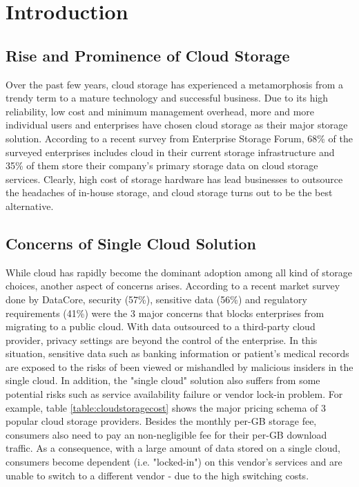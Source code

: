\chapter{Introduction}
\label{c:intro}

\section{Rise and Prominence of Cloud Storage}
\label{s:riseandprominenceofcloudstorage}
Over the past few years, cloud storage has experienced a metamorphosis from a trendy term to a mature technology and successful business. Due to its high reliability, low cost and minimum management overhead, more and more individual users and enterprises have chosen cloud storage as their major storage solution. According to a recent survey from Enterprise Storage Forum\cite{storagetrends2018}, 68\% of the surveyed enterprises includes cloud in their current storage infrastructure and 35\% of them store their company's primary storage data on cloud storage services. Clearly, high cost of storage hardware has lead businesses to outsource the headaches of in-house storage, and cloud storage turns out to be the best alternative.

\section{Concerns of Single Cloud Solution}
\label{s:concernsofsinglecloudsolution}
While cloud has rapidly become the dominant adoption among all kind of storage choices, another aspect of concerns arises. According to a recent market survey done by DataCore\cite{datacore2017survey}, security (57\%), sensitive data (56\%) and regulatory requirements (41\%) were the 3 major concerns that blocks enterprises from migrating to a public cloud. With data outsourced to a third-party cloud provider, privacy settings are beyond the control of the enterprise. In this situation, sensitive data such as banking information or patient's medical records are exposed to the risks of been viewed or mishandled by malicious insiders in the single cloud. In addition, the "single cloud" solution also suffers from some potential risks such as service availability failure or vendor lock-in problem. For example, table \ref{table:cloudstoragecost} shows the major pricing schema of 3 popular cloud storage providers. Besides the monthly per-GB storage fee, consumers also need to pay an non-negligible fee for their per-GB download traffic. As a consequence, with a large amount of data stored on a single cloud, consumers become dependent (i.e. "locked-in") on this vendor's services and are unable to switch to a different vendor - due to the high switching costs.

